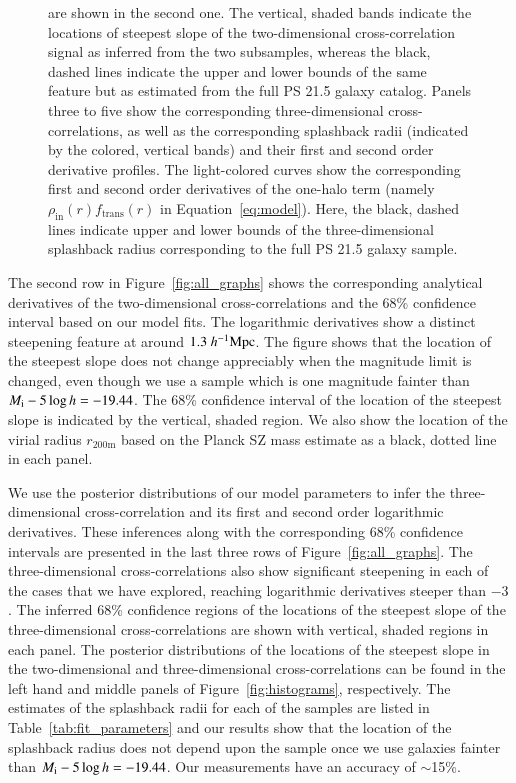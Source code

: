 \documentclass[iop, apjl, twocolappendix, numberedappendix]{emulateapj}
\def\mpch{h^{-1}{\rm Mpc}}
\begin{document}
\begin{figure}
{are shown in the second one. The vertical, shaded bands indicate the
locations of steepest slope of the two-dimensional cross-correlation signal
as inferred from the two subsamples, whereas the black, dashed lines
indicate the upper and lower bounds of the same feature but as
estimated from the full PS 21.5 galaxy catalog.
Panels three to five show the corresponding three-dimensional
cross-correlations, as well as the corresponding
splashback radii (indicated by the colored, vertical bands) and
their first and second order derivative profiles. The light-colored
curves show the corresponding first and second order derivatives of the one-halo
term (namely $\rho_{\mathrm{in}}(r)f_{\mathrm{trans}}(r)$ in Equation~\ref{eq:model}). Here, the black, dashed lines indicate upper and lower bounds of the
three-dimensional splashback radius corresponding to the full PS 21.5 galaxy sample.}
   \label{fig:color_curve_all}
\end{figure}

The second row in Figure~\ref{fig:all_graphs} shows the
corresponding analytical derivatives of the two-dimensional
cross-correlations and the 68\% confidence interval based on our
model fits. The logarithmic derivatives show a distinct steepening
feature at around $1.3~\mpch$. The figure shows that the
location of the steepest slope does not change appreciably when the
magnitude limit is changed, even though we use a sample which is one
magnitude fainter than $M_{\rm i}-5\log h=-19.44$. The 68\%
confidence interval of the location of the steepest slope is
indicated by the vertical, shaded region. We also show the location
of the virial radius $r_{\mathrm{200m}}$ based on the Planck SZ mass estimate
as a black, dotted line in each panel.

We use the posterior distributions of our model parameters to infer
the three-dimensional cross-correlation and its first and second order logarithmic
derivatives. These inferences along with the corresponding 68\%
confidence intervals are presented in the last three rows of
Figure~\ref{fig:all_graphs}. The three-dimensional cross-correlations
also show significant steepening in each of the cases that we have
explored, reaching logarithmic derivatives steeper than $-3$. The
inferred 68\% confidence regions of the locations of the steepest
slope of the three-dimensional cross-correlations are shown with
vertical, shaded regions in each panel. The posterior
distributions of the locations of the steepest slope in the
two-dimensional and three-dimensional cross-correlations can be
found in the left hand and middle panels of
Figure~\ref{fig:histograms}, respectively. The estimates of the splashback radii
for each of the samples are listed in Table~\ref{tab:fit_parameters}
and our results show that the location of the splashback radius does
not depend upon the sample once we use galaxies fainter than $M_{\rm
i}-5\log h=-19.44$. Our measurements have an accuracy of $\sim$15\%.
\end{document}
